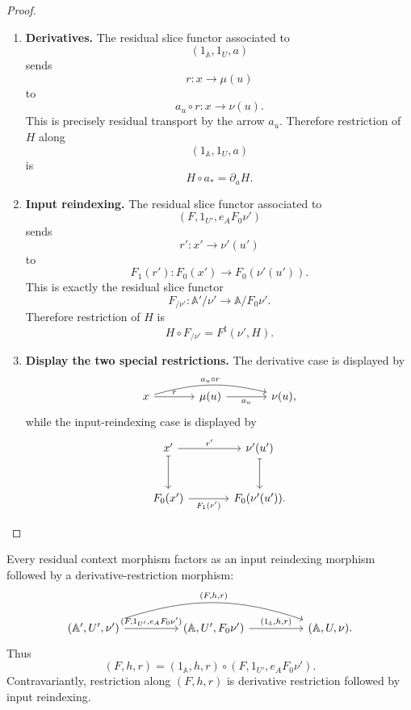 \begin{proof}
    \leavevmode
    \begin{enumerate}
        \item \textbf{Derivatives.}
        The residual slice functor associated to
        \[
            (1_{\mathbb A},1_U,a)
        \]
        sends
        \[
            r:x\to\mu(u)
        \]
        to
        \[
            a_u\circ r:x\to\nu(u).
        \]
        This is precisely residual transport by the arrow \(a_u\). Therefore
        restriction of \(H\) along
        \[
            (1_{\mathbb A},1_U,a)
        \]
        is
        \[
            H\circ a_*=\partial_aH.
        \]

        \item \textbf{Input reindexing.}
        The residual slice functor associated to
        \[
            (F,1_{U'},e_AF_0\nu')
        \]
        sends
        \[
            r':x'\to\nu'(u')
        \]
        to
        \[
            F_1(r'):F_0(x')\to F_0(\nu'(u')).
        \]
        This is exactly the residual slice functor
        \[
            F_{/\nu'}:
            \mathbb A'/\nu'
            \to
            \mathbb A/F_0\nu'.
        \]
        Therefore restriction of \(H\) is
        \[
            H\circ F_{/\nu'}=F^\sharp(\nu',H).
        \]

        \item \textbf{Display the two special restrictions.}
        The derivative case is displayed by
        \[
        \begin{tikzcd}[column sep=large, row sep=large]
            x
                \arrow[r, "r"]
                \arrow[rr, "a_u\circ r", bend left=15]
            &
            \mu(u)
                \arrow[r, "a_u"']
            &
            \nu(u),
        \end{tikzcd}
        \]
        while the input-reindexing case is displayed by
        \[
        \begin{tikzcd}[column sep=large, row sep=large]
            x'
                \arrow[r, "r'"]
                \arrow[d, maps to]
            &
            \nu'(u')
                \arrow[d, maps to]
            \\
            F_0(x')
                \arrow[r, "F_1(r')"']
            &
            F_0(\nu'(u')).
        \end{tikzcd}
        \]
    \end{enumerate}
\end{proof}

Every residual context morphism factors as an input reindexing morphism
followed by a derivative-restriction morphism:
\[
\begin{tikzcd}[column sep=huge, row sep=large]
    (\mathbb A',U',\nu')
        \arrow[r, "{(F,1_{U'},e_AF_0\nu')}"]
        \arrow[rr, bend left=18, "{(F,h,r)}"]
    &
    (\mathbb A,U',F_0\nu')
        \arrow[r, "{(1_{\mathbb A},h,r)}"]
    &
    (\mathbb A,U,\nu).
\end{tikzcd}
\]
Thus
\[
    (F,h,r)
    =
    (1_{\mathbb A},h,r)\circ(F,1_{U'},e_AF_0\nu').
\]
Contravariantly, restriction along \((F,h,r)\) is derivative restriction
followed by input reindexing.

